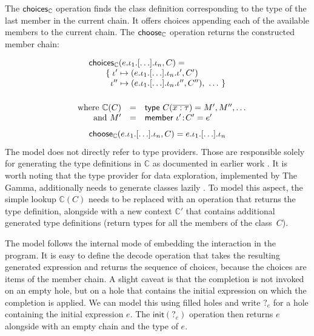 \documentclass[a4paper,UKenglish,cleveref, autoref, thm-restate]{lipics-v2021}
\newcommand{\ident}[1]{\textsf{#1}}
\newcommand{\select}{\textnormal{\ident{choose}}}
\newcommand{\choices}{\textnormal{\ident{choices}}}
\begin{document}
The $\choices_\mathbb{C}$ operation finds the class definition corresponding to the type of the
last member in the current chain. It offers choices appending each of the available
members to the current chain. The $\select_\mathbb{C}$ operation returns the constructed
member chain:

\[
\begin{array}{l}
\choices_\mathbb{C}(e . \iota_1 . \lbrack\ldots\rbrack . \iota_n, C) =\\
\qquad \{\; \iota' \mapsto (e . \iota_1 . \lbrack\ldots\rbrack . \iota_n . \iota', C')\\
\qquad \;\; \iota'' \mapsto (e . \iota_1 . \lbrack\ldots\rbrack . \iota_n . \iota'', C''), ~\ldots~\}\\[1em]
\end{array}
\]\vspace{-2em}
\[
\begin{array}{rcl}
\quad \textnormal{where}~\mathbb{C}(C) &=& \ident{type}~C(\overline{x:\tau}) = M', M'', \ldots\\
\quad \textnormal{and}~M' &=& \ident{member}~\iota'\!:\!C'=e'
\end{array}
\]\vspace{-0.5em}
\[
\select_\mathbb{C}(e . \iota_1 . \lbrack\ldots\rbrack . \iota_n, C) = e . \iota_1 . \lbrack\ldots\rbrack . \iota_n
\]
The model does not directly refer to type providers. Those are responsible solely for generating
the type definitions in $\mathbb{C}$ as documented in earlier work \cite{petricek-2016-fsdata}.
It is worth noting that the type provider for data exploration, implemented by The Gamma,
additionally needs to generate classes lazily \cite{petricek-2017-dotdriven}. To model this aspect,
the simple lookup $\mathbb{C}(C)$ needs to be replaced with an operation that returns the type
definition, alongside with a new context $\mathbb{C}'$ that contains additional generated
type definitions (return types for all the members of the class~$C$).

The model follows the internal mode of embedding the interaction in the program. It is easy to
define the \ident{decode} operation that takes the resulting generated expression and returns the
sequence of choices, because the choices are items of the member chain. A slight caveat is that
the completion is not invoked on an empty hole, but on a hole that contains the initial expression
on which the completion is applied. We can model this using filled holes \cite{omar-2019-holes}
and write $?_e$ for a hole containing the initial expression $e$. The $\ident{init}(?_e)$ operation
then returns $e$ alongside with an empty chain and the type of $e$.
\end{document}

